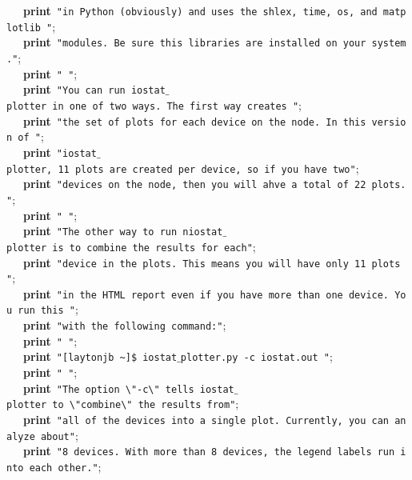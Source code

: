 \mbox{}\ \ \ \textbf{print}\ \texttt{"{}in\ Python\ (obviously)\ and\ uses\ the\ shlex,\ time,\ os,\ and\ matplotlib\ "{}}; \\
\mbox{}\ \ \ \textbf{print}\ \texttt{"{}modules.\ Be\ sure\ this\ libraries\ are\ installed\ on\ your\ system."{}}; \\
\mbox{}\ \ \ \textbf{print}\ \texttt{"{}\ "{}}; \\
\mbox{}\ \ \ \textbf{print}\ \texttt{"{}You\ can\ run\ iostat$\_$plotter\ in\ one\ of\ two\ ways.\ The\ first\ way\ creates\ "{}}; \\
\mbox{}\ \ \ \textbf{print}\ \texttt{"{}the\ set\ of\ plots\ for\ each\ device\ on\ the\ node.\ In\ this\ version\ of\ "{}}; \\
\mbox{}\ \ \ \textbf{print}\ \texttt{"{}iostat$\_$plotter,\ 11\ plots\ are\ created\ per\ device,\ so\ if\ you\ have\ two"{}}; \\
\mbox{}\ \ \ \textbf{print}\ \texttt{"{}devices\ on\ the\ node,\ then\ you\ will\ ahve\ a\ total\ of\ 22\ plots."{}}; \\
\mbox{}\ \ \ \textbf{print}\ \texttt{"{}\ "{}}; \\
\mbox{}\ \ \ \textbf{print}\ \texttt{"{}The\ other\ way\ to\ run\ niostat$\_$plotter\ is\ to\ combine\ the\ results\ for\ each"{}}; \\
\mbox{}\ \ \ \textbf{print}\ \texttt{"{}device\ in\ the\ plots.\ This\ means\ you\ will\ have\ only\ 11\ plots\ "{}}; \\
\mbox{}\ \ \ \textbf{print}\ \texttt{"{}in\ the\ HTML\ report\ even\ if\ you\ have\ more\ than\ one\ device.\ You\ run\ this\ "{}}; \\
\mbox{}\ \ \ \textbf{print}\ \texttt{"{}with\ the\ following\ command:"{}}; \\
\mbox{}\ \ \ \textbf{print}\ \texttt{"{}\ "{}}; \\
\mbox{}\ \ \ \textbf{print}\ \texttt{"{}[laytonjb\ \textasciitilde{}]\$\ iostat$\_$plotter.py\ -c\ iostat.out\ "{}}; \\
\mbox{}\ \ \ \textbf{print}\ \texttt{"{}\ "{}}; \\
\mbox{}\ \ \ \textbf{print}\ \texttt{"{}The\ option\ \textbackslash{}"{}-c\textbackslash{}"{}\ tells\ iostat$\_$plotter\ to\ \textbackslash{}"{}combine\textbackslash{}"{}\ the\ results\ from"{}}; \\
\mbox{}\ \ \ \textbf{print}\ \texttt{"{}all\ of\ the\ devices\ into\ a\ single\ plot.\ Currently,\ you\ can\ analyze\ about"{}}; \\
\mbox{}\ \ \ \textbf{print}\ \texttt{"{}8\ devices.\ With\ more\ than\ 8\ devices,\ the\ legend\ labels\ run\ into\ each\ other."{}}; \\
